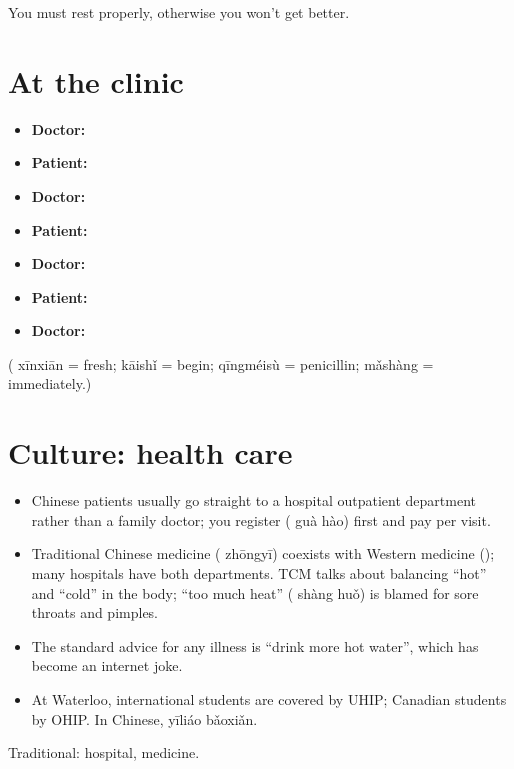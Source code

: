  You must rest properly, otherwise you won't get
better.

\section{At the clinic}

\begin{example}[A visit]\leavevmode
\begin{itemize}
  \item \textbf{Doctor:} 
  \item \textbf{Patient:} 
  \item \textbf{Doctor:} 
  \item \textbf{Patient:} 
  \item \textbf{Doctor:} 
  \item \textbf{Patient:} 
  \item \textbf{Doctor:} 
\end{itemize}
( xīnxiān = fresh;  kāishǐ = begin;  qīngméisù = penicillin;
 mǎshàng = immediately.)
\end{example}

\section{Culture: health care}

\begin{aside}
\begin{itemize}
  \item Chinese patients usually go straight to a hospital outpatient department rather
        than a family doctor; you register ( guà hào) first and pay per visit.
  \item Traditional Chinese medicine ( zhōngyī) coexists with Western medicine
        (); many hospitals have both departments. TCM talks about balancing
        ``hot'' and ``cold'' in the body; ``too much heat'' ( shàng huǒ) is blamed
        for sore throats and pimples.
  \item The standard advice for any illness is  ``drink more hot water'', which
        has become an internet joke.
  \item At Waterloo, international students are covered by UHIP; Canadian students by
        OHIP. In Chinese,  yīliáo bǎoxiǎn.
\end{itemize}
Traditional:  hospital,  medicine.
\end{aside}

